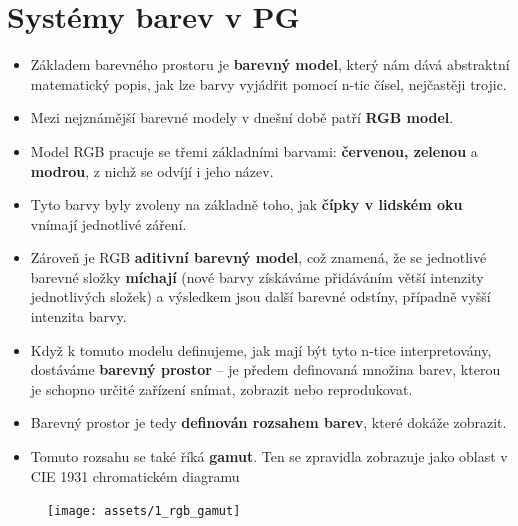 \section{Systémy barev v PG}
\begin{itemize}
    \item Základem barevného prostoru je \textbf{barevný model}, který nám dává abstraktní matematický popis, jak lze barvy vyjádřit pomocí n-tic čísel, nejčastěji trojic.
    \item Mezi nejznámější barevné modely v dnešní době patří \textbf{RGB model}.
    \item Model RGB pracuje se třemi základními barvami: \textbf{červenou, zelenou} a \textbf{modrou}, z nichž se odvíjí i jeho název.
    \item Tyto barvy byly zvoleny na základně toho, jak \textbf{čípky v lidském oku} vnímají jednotlivé záření.
    \item Zároveň je RGB \textbf{aditivní barevný model}, což znamená, že se jednotlivé barevné složky \textbf{míchají} (nové barvy získáváme přidáváním větší intenzity jednotlivých složek) a výsledkem jsou další barevné odstíny, případně vyšší intenzita barvy.
    \item Když k tomuto modelu definujeme, jak mají být tyto n-tice interpretovány, dostáváme \textbf{barevný prostor} -- je předem definovaná množina barev, kterou je schopno určité zařízení snímat, zobrazit nebo reprodukovat.
    \item Barevný prostor je tedy \textbf{definován rozsahem barev}, které dokáže zobrazit.
    \item Tomuto rozsahu se také říká \textbf{gamut}. Ten se zpravidla zobrazuje jako oblast v CIE 1931 chromatickém diagramu
\end{itemize}
\begin{figure}[H]
    \centering
    \texttt{[image: assets/1\_rgb\_gamut]}
\end{figure}
